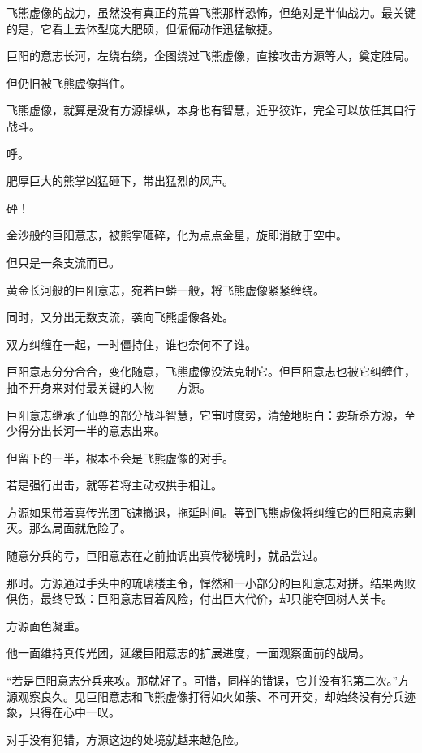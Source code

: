 
\begin{this_body}

飞熊虚像的战力，虽然没有真正的荒兽飞熊那样恐怖，但绝对是半仙战力。最关键的是，它看上去体型庞大肥硕，但偏偏动作迅猛敏捷。

巨阳的意志长河，左绕右绕，企图绕过飞熊虚像，直接攻击方源等人，奠定胜局。

但仍旧被飞熊虚像挡住。

飞熊虚像，就算是没有方源操纵，本身也有智慧，近乎狡诈，完全可以放任其自行战斗。

呼。

肥厚巨大的熊掌凶猛砸下，带出猛烈的风声。

砰！

金沙般的巨阳意志，被熊掌砸碎，化为点点金星，旋即消散于空中。

但只是一条支流而已。

黄金长河般的巨阳意志，宛若巨蟒一般，将飞熊虚像紧紧缠绕。

同时，又分出无数支流，袭向飞熊虚像各处。

双方纠缠在一起，一时僵持住，谁也奈何不了谁。

巨阳意志分分合合，变化随意，飞熊虚像没法克制它。但巨阳意志也被它纠缠住，抽不开身来对付最关键的人物——方源。

巨阳意志继承了仙尊的部分战斗智慧，它审时度势，清楚地明白：要斩杀方源，至少得分出长河一半的意志出来。

但留下的一半，根本不会是飞熊虚像的对手。

若是强行出击，就等若将主动权拱手相让。

方源如果带着真传光团飞速撤退，拖延时间。等到飞熊虚像将纠缠它的巨阳意志剿灭。那么局面就危险了。

随意分兵的亏，巨阳意志在之前抽调出真传秘境时，就品尝过。

那时。方源通过手头中的琉璃楼主令，悍然和一小部分的巨阳意志对拼。结果两败俱伤，最终导致：巨阳意志冒着风险，付出巨大代价，却只能夺回树人关卡。

方源面色凝重。

他一面维持真传光团，延缓巨阳意志的扩展进度，一面观察面前的战局。

“若是巨阳意志分兵来攻。那就好了。可惜，同样的错误，它并没有犯第二次。”方源观察良久。见巨阳意志和飞熊虚像打得如火如荼、不可开交，却始终没有分兵迹象，只得在心中一叹。

对手没有犯错，方源这边的处境就越来越危险。


\end{this_body}
